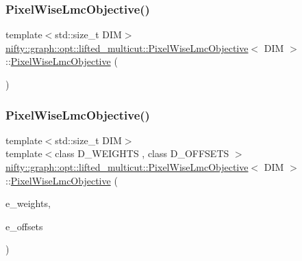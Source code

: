 \subsubsection{\texorpdfstring{Pixel\+Wise\+Lmc\+Objective()}{PixelWiseLmcObjective()}\hspace{0.1cm}{\footnotesize\ttfamily [3/4]}}
{\footnotesize\ttfamily template$<$std\+::size\+\_\+t D\+IM$>$ \\
\hyperlink{classnifty_1_1graph_1_1opt_1_1lifted__multicut_1_1PixelWiseLmcObjective}{nifty\+::graph\+::opt\+::lifted\+\_\+multicut\+::\+Pixel\+Wise\+Lmc\+Objective}$<$ D\+IM $>$\+::\hyperlink{classnifty_1_1graph_1_1opt_1_1lifted__multicut_1_1PixelWiseLmcObjective}{Pixel\+Wise\+Lmc\+Objective} (\begin{DoxyParamCaption}{ }\end{DoxyParamCaption})\hspace{0.3cm}{\ttfamily [inline]}}

\mbox{\label{classnifty_1_1graph_1_1opt_1_1lifted__multicut_1_1PixelWiseLmcObjective_a289a981e481ffd785ff9e902a1c6b81c}} 
\subsubsection{\texorpdfstring{Pixel\+Wise\+Lmc\+Objective()}{PixelWiseLmcObjective()}\hspace{0.1cm}{\footnotesize\ttfamily [4/4]}}
{\footnotesize\ttfamily template$<$std\+::size\+\_\+t D\+IM$>$ \\
template$<$class D\+\_\+\+W\+E\+I\+G\+H\+TS , class D\+\_\+\+O\+F\+F\+S\+E\+TS $>$ \\
\hyperlink{classnifty_1_1graph_1_1opt_1_1lifted__multicut_1_1PixelWiseLmcObjective}{nifty\+::graph\+::opt\+::lifted\+\_\+multicut\+::\+Pixel\+Wise\+Lmc\+Objective}$<$ D\+IM $>$\+::\hyperlink{classnifty_1_1graph_1_1opt_1_1lifted__multicut_1_1PixelWiseLmcObjective}{Pixel\+Wise\+Lmc\+Objective} (\begin{DoxyParamCaption}\item[{const xt\+::xexpression$<$ D\+\_\+\+W\+E\+I\+G\+H\+TS $>$ \&}]{e\+\_\+weights,  }\item[{const xt\+::xexpression$<$ D\+\_\+\+O\+F\+F\+S\+E\+TS $>$ \&}]{e\+\_\+offsets }\end{DoxyParamCaption})\hspace{0.3cm}{\ttfamily [inline]}}



